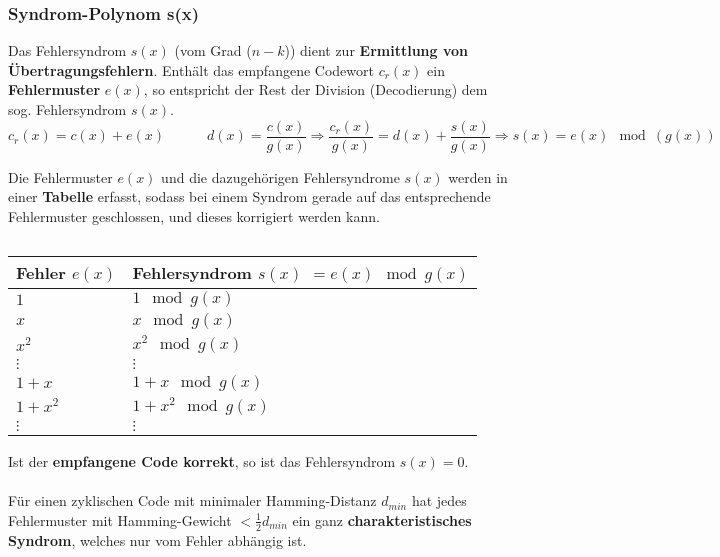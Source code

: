 \subsubsection{Syndrom-Polynom s(x) }
\begin{minipage}{13.1cm}
Das Fehlersyndrom $s(x)$ (vom Grad ($n-k$)) dient zur \textbf{Ermittlung von Übertragungsfehlern}.
Enthält das empfangene Codewort $c_r(x)$ ein \textbf{Fehlermuster} $e(x)$, so entspricht der
Rest der Division (Decodierung) dem sog. Fehlersyndrom $s(x)$.
$$ c_r(x) = c(x) + e(x) \quad \qquad d(x) = \dfrac{c(x)}{g(x)} \Longrightarrow 
\dfrac{c_r(x)}{g(x)} = d(x) + \dfrac{s(x)}{g(x)} \Longrightarrow s(x) = e(x) \mod{(g(x))}$$

	Die Fehlermuster $e(x)$ und die dazugehörigen Fehlersyndrome $s(x)$ werden in einer
\textbf{Tabelle} erfasst, sodass bei einem Syndrom gerade auf das entsprechende Fehlermuster
geschlossen, und dieses korrigiert werden kann.
\end{minipage} 
\begin{minipage}{0.3cm}
$\quad$
\end{minipage}
\begin{minipage}{7cm}
	\begin{tabular}{| p{1.8cm} | p{2.8cm} |}
  		\hline
  			Fehler $e(x)$ & Fehlersyndrom $s(x)$ $= e(x)  \mod{g(x)} $ \\
  		\hline
  			$1$	&	$1 \mod{g(x)}$ \\
  			$x$	&	$x \mod{g(x)}$ \\
  			$x^2$	&	$x^2 \mod{g(x)}$ \\
  			$\vdots$ & $\vdots$ \\
  			$1 + x$ &	$1+x \mod{g(x)}$ \\
  			$1 + x^2$ &	$1+x^2 \mod{g(x)}$ \\
  			$\vdots$ & $\vdots$  	\\		
  		\hline
  	\end{tabular}
\end{minipage}

Ist der \textbf{empfangene Code korrekt}, so ist das Fehlersyndrom \boldmath$s(x) =
0$\unboldmath.\\ \\
Für einen zyklischen Code mit minimaler Hamming-Distanz $d_{min}$ hat jedes
Fehlermuster mit Hamming-Gewicht $< \frac12 d_{min}$ ein ganz \textbf{charakteristisches Syndrom}, welches nur vom Fehler
abhängig ist.

